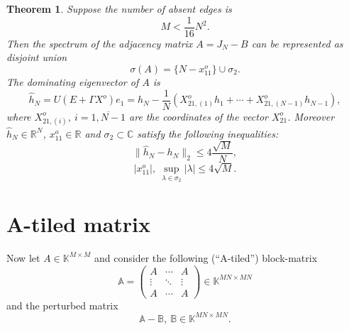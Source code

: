 \documentclass[a4paper]{article}
\newtheorem{thm}{Theorem}
\theoremstyle{definition}
\begin{document}
\begin{thm}
    Suppose the number of absent edges is
    \[ M < \frac{1}{16} N^2. \]
    Then the spectrum of the adjacency matrix \( A = J_N - B \)
        can be represented as disjoint union
    \[
        \sigma(A) = \{ N - x_{11}^o \} \cup \sigma_2.
    \]
    The dominating eigenvector of \( A \) is
    \[
        \hat{h}_N = U(E+\Gamma X^o) e_1 =
            h_N - \frac1N (X_{21,(1)}^o h_1 + \cdots + X_{21, (N{-}1)}^o h_{N{-}1}),
    \]
    where \( X_{21,(i)}^o,\ i=\overline{1,N{-}1} \) are the coordinates
    of the vector \( X_{21}^o \).
    Moreover \( \hat{h}_N\in\mathbb{R}^{N} \),
    \( x_{11}^o\in\mathbb{R} \) and \( \sigma_2\subset\mathbb{C} \)
    satisfy the following inequalities:
    \[
        \|\hat{h}_N - h_N\|_2 \leq 4\frac{\sqrt{M}}{N},
    \]
    \[
        \lvert x_{11}^o \rvert,
        \ \sup_{\lambda\in\sigma_2} \lvert\lambda\rvert \leq 4\sqrt{M}.
    \]
\end{thm}

\section{A-tiled matrix}

Now let \( A\in\mathbb{K}^{M{\times}M} \)
    and consider the following (``A-tiled'') block-matrix
    \[
        \mathbb{A} =
        \begin{pmatrix}
            A & \cdots & A \\
            \vdots & \ddots & \vdots \\
            A & \cdots & A
        \end{pmatrix}
        \in\mathbb{K}^{{MN}{\times}{MN}}
    \]
    and the perturbed matrix
    \[
        \mathbb{A} - \mathbb{B},\ \mathbb{B}\in\mathbb{K}^{{MN}{\times}{MN}}.
    \]
\end{document}
